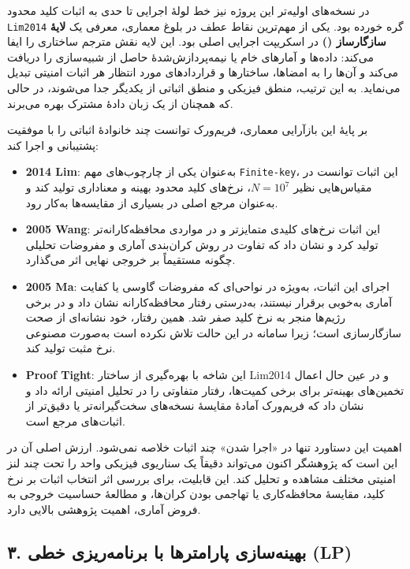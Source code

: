 \begin{sloppypar}
در نسخه‌های اولیه‌تر این پروژه نیز خط لولهٔ اجرایی تا حدی به اثبات کلید محدود \texttt{Lim2014} گره خورده بود. یکی از مهم‌ترین نقاط عطف در بلوغ معماری، معرفی یک \textbf{لایهٔ سازگارساز ()} در اسکریپت اجرایی اصلی بود. این لایه نقش مترجم ساختاری را ایفا می‌کند: داده‌ها و آمارهای خام یا نیمه‌پردازش‌شدهٔ حاصل از شبیه‌سازی را دریافت می‌کند و آن‌ها را به امضاها، ساختارها و قراردادهای مورد انتظار هر اثبات امنیتی تبدیل می‌نماید. به این ترتیب، منطق فیزیکی و منطق اثباتی از یکدیگر جدا می‌شوند، در حالی که همچنان از یک زبان دادهٔ مشترک بهره می‌برند.

بر پایهٔ این بازآرایی معماری، فریم‌ورک توانست چند خانوادهٔ اثباتی را با موفقیت پشتیبانی و اجرا کند:
\begin{itemize}
	\item \textbf{2014 Lim}: به‌عنوان یکی از چارچوب‌های مهم \texttt{Finite-key}، این اثبات توانست در مقیاس‌هایی نظیر \(N = 10^7\)، نرخ‌های کلید محدود بهینه و معناداری تولید کند و به‌عنوان مرجع اصلی در بسیاری از مقایسه‌ها به‌کار رود.
	\item \textbf{2005 Wang}: این اثبات نرخ‌های کلیدی متمایزتر و در مواردی محافظه‌کارانه‌تر تولید کرد و نشان داد که تفاوت در روش کران‌بندی آماری و مفروضات تحلیلی چگونه مستقیماً بر خروجی نهایی اثر می‌گذارد.
	\item \textbf{2005 Ma}: اجرای این اثبات، به‌ویژه در نواحی‌ای که مفروضات گاوسی یا کفایت آماری به‌خوبی برقرار نیستند، به‌درستی رفتار محافظه‌کارانه نشان داد و در برخی رژیم‌ها منجر به نرخ کلید صفر شد. همین رفتار، خود نشانه‌ای از صحت سازگارسازی است؛ زیرا سامانه در این حالت تلاش نکرده است به‌صورت مصنوعی نرخ مثبت تولید کند.
	\item \textbf{Proof Tight}: این شاخه با بهره‌گیری از ساختار Lim2014 و در عین حال اعمال تخمین‌های بهینه‌تر برای برخی کمیت‌ها، رفتار متفاوتی را در تحلیل امنیتی ارائه داد و نشان داد که فریم‌ورک آمادهٔ مقایسهٔ نسخه‌های سخت‌گیرانه‌تر یا دقیق‌تر از اثبات‌های مرجع است.
\end{itemize}

اهمیت این دستاورد تنها در «اجرا شدن» چند اثبات خلاصه نمی‌شود. ارزش اصلی آن در این است که پژوهشگر اکنون می‌تواند دقیقاً یک سناریوی فیزیکی واحد را تحت چند لنز امنیتی مختلف مشاهده و تحلیل کند. این قابلیت، برای بررسی اثر انتخاب اثبات بر نرخ کلید، مقایسهٔ محافظه‌کاری یا تهاجمی بودن کران‌ها، و مطالعهٔ حساسیت خروجی به فروض آماری، اهمیت پژوهشی بالایی دارد.

\subsection*{۳. بهینه‌سازی پارامترها با برنامه‌ریزی خطی (LP)}


\end{sloppypar}
